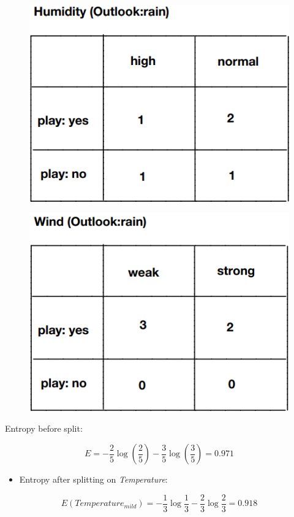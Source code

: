 \documentclass[11pt]{article}
\makeatletter
\def\maxwidth{\ifdim\Gin@nat@width>\linewidth\linewidth
    \else\Gin@nat@width\fi}
\let\Oldincludegraphics\includegraphics
\renewcommand{\includegraphics}[1]{\Oldincludegraphics[width=.8\maxwidth]{#1}}
\providecommand{\tightlist}{%
      \setlength{\itemsep}{0pt}\setlength{\parskip}{0pt}}
\makeatother
\begin{document}
\begin{figure}[H]
\centering
\includegraphics{11.png}
\caption{}
\end{figure}

\begin{figure}[H]
\centering
\includegraphics{12.png}
\caption{}
\end{figure}

Entropy before split:

\[E = -\frac{2}{5} \log (\frac{2}{5}) -  \frac{3}{5} \log (\frac{3}{5}) = 0.971\]

\begin{itemize}
\tightlist
\item
  Entropy after splitting on \emph{Temperature}:
\end{itemize}

\[E(Temperature_{mild})= -\frac{1}{3} \log \frac{1}{3} - \frac{2}{3} \log \frac{2}{3} = 0.918\]
\end{document}
